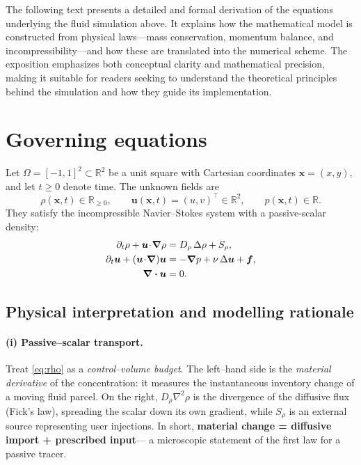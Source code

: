 \documentclass[11pt]{article}
\title{}
\author{}
\date{}
\begin{document}

The following text presents a detailed and formal derivation of the equations underlying the fluid simulation above. It explains how the mathematical model is constructed from physical laws—mass conservation, momentum balance, and incompressibility—and how these are translated into the numerical scheme. The exposition emphasizes both conceptual clarity and mathematical precision, making it suitable for readers seeking to understand the theoretical principles behind the simulation and how they guide its implementation.

\section{Governing equations}\label{sec:eq}
Let $\Omega=[-1,1]^2\subset\mathbb{R}^2$ be a unit square with Cartesian
coordinates $\bm{x}=(x,y)$, and let $t\ge 0$ denote time.
The unknown fields are
\[
    \rho(\bm{x},t)\in\mathbb{R}_{\ge 0}, \qquad
    \bm{u}(\bm{x},t)=(u,v)^{\!\top}\in\mathbb{R}^2, \qquad
    p(\bm{x},t)\in\mathbb{R}.
\]
They satisfy the incompressible Navier–Stokes system with a
passive‐scalar density:
\begin{subequations}\label{eq:gov}
\begin{align}
\partial_t\rho + \bm{u}\!\cdot\!\grad\rho &= D_\rho \,\Delta\rho
               + S_\rho,                                      \label{eq:rho}\\
\partial_t\bm{u} + (\bm{u}\!\cdot\!\grad)\bm{u} &=
      -\grad p + \nu\,\Delta\bm{u} + \bm{f},                  \label{eq:u}\\
\div \bm{u} &= 0.                                             \label{eq:inc}
\end{align}
\end{subequations}
\subsection{Physical interpretation and modelling rationale}
\label{subsec:meaning}

\paragraph{(i) Passive–scalar transport.}
Treat \eqref{eq:rho} as a \emph{control–volume budget}.  
The left–hand side is the \emph{material derivative} of the
concentration: it measures the instantaneous inventory change of a
moving fluid parcel. On the right, \(D_\rho\nabla^{2}\rho\) is the divergence of the
diffusive flux (Fick’s law), spreading the scalar down its own
gradient, while \(S_\rho\) is an external source representing user
injections.  
In short, \textbf{material change = diffusive import + prescribed input}—
a microscopic statement of the first law for a passive tracer.
\end{document}
